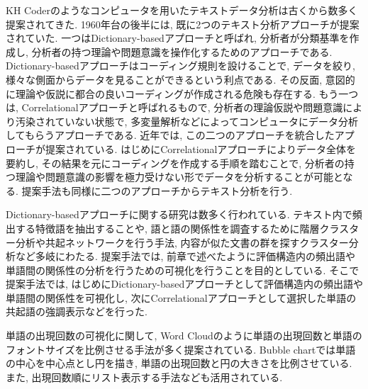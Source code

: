 \documentclass[syuuron]{kuee}
\begin{document}
		KH Coderのようなコンピュータを用いたテキストデータ分析は古くから数多く提案されてきた. 
		1960年台の後半には, 既に2つのテキスト分析アプローチが提案されていた. 
		一つはDictionary-basedアプローチと呼ばれ, 分析者が分類基準を作成し, 
		分析者の持つ理論や問題意識を操作化するためのアプローチである. 
		Dictionary-basedアプローチはコーディング規則を設けることで, データを絞り, 様々な側面からデータを見ることができるという利点である. 
		その反面, 意図的に理論や仮説に都合の良いコーディングが作成される危険も存在する. 
		もう一つは, Correlationalアプローチと呼ばれるもので, 分析者の理論仮説や問題意識により汚染されていない状態で, 
		多変量解析などによってコンピュータにデータ分析してもらうアプローチである. 
		近年では, この二つのアプローチを統合したアプローチが提案されている\cite{kh1, kh2}. 
		はじめにCorrelationalアプローチによりデータ全体を要約し, その結果を元にコーディングを作成する手順を踏むことで, 
		分析者の持つ理論や問題意識の影響を極力受けない形でデータを分析することが可能となる. 
		提案手法も同様に二つのアプローチからテキスト分析を行う. 
		
		Dictionary-basedアプローチに関する研究は数多く行われている. 
		テキスト内で頻出する特徴語を抽出することや, 語と語の関係性を調査するために階層クラスター分析や共起ネットワークを行う手法, 
		内容が似た文書の群を探すクラスター分析など多岐にわたる. 
		提案手法では, 前章で述べたように評価構造内の頻出語や単語間の関係性の分析を行うための可視化を行うことを目的としている. 
		そこで提案手法では, はじめにDictionary-basedアプローチとして評価構造内の頻出語や単語間の関係性を可視化し, 
		次にCorrelationalアプローチとして選択した単語の共起語の強調表示などを行った. 
		
		単語の出現回数の可視化に関して, Word Cloudのように単語の出現回数と単語のフォントサイズを比例させる手法が多く提案されている\cite{wc1}. 
		Bubble chartでは単語の中心を中心点とし円を描き, 単語の出現回数と円の大きさを比例させている. 
		また, 出現回数順にリスト表示する手法なども活用されている. 
		
\end{document}
